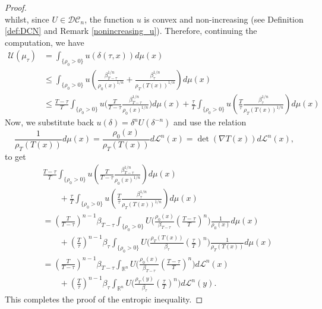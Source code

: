 \documentclass[10pt,a4paper]{amsart}
\begin{document}
\begin{proof}
\begin{equation}
			\end{equation}
			whilst, since $U\in\mathcal{DC}_n$, the function $u$ is convex and non-increasing (see Definition \ref{def:DCN} and Remark \ref{nonincreasing_u}). Therefore, continuing the computation, we have
			\begin{align}
				\mathcal{U}(\mu_\tau)&=\int_{\{\rho_0>0\}}u\left(\delta(\tau,x)\right)d\mu(x)\\
				&\leq\int_{\{\rho_0>0\}}u\left(\frac{\beta_{T-\tau}^{1/n}}{\rho_0(x)^{1/n}} +\frac{\beta_{\tau}^{1/n}}{\rho_T(T(x))^{1/n}}\right)d\mu(x)\\
				&\leq \frac{T-\tau}{T}\int_{\{\rho_0>0\}}u\bigg(\frac{T}{T-\tau}\frac{\beta_{T-\tau}^{1/n}}{\rho_0(x)^{1/n}}\bigg)d\mu(x)
				+\frac{\tau}{T}\int_{\{\rho_0>0\}}u\left(\frac{T}{\tau}\frac{\beta_{\tau}^{1/n}}{\rho_T(T(x))^{1/n}}\right)d\mu(x)
			\end{align}
			Now, we substitute back $u(\delta)=\delta^{n}U(\delta^{-n})$ and use the relation 
			\begin{equation}
				\frac{1}{\rho_T(T(x))}d\mu(x)=\frac{\rho_0(x)}{\rho_T(T(x))}d\mathscr{L}^n(x)=\det(\nabla T(x))d\mathscr{L}^n(x),
			\end{equation}
			to get
			\begin{align}
				&\frac{T-\tau}{T}\int_{\{\rho_0>0\}}u\left(\frac{T}{T-\tau}\frac{\beta_{T-\tau}^{1/n}}{\rho_0(x)^{1/n}}\right)d\mu(x)\\
				&\qquad+\frac{\tau}{T}\int_{\{\rho_0>0\}}u\left(\frac{T}{\tau}\frac{\beta_{\tau}^{1/n}}{\rho_T(T(x))^{1/n}}\right)d\mu(x)\\
				&=\left(\frac{T}{T-\tau}\right)^{n-1}\beta_{T-\tau}\int_{\{\rho_0>0\}}U\bigg(\frac{\rho_0(x)}{\beta_{T-\tau}}
				\left(\frac{T-\tau}{T}\right)^n\bigg)\frac{1}{\rho_0(x)}d\mu(x)\\
				&\qquad+\left(\frac{T}{\tau}\right)^{n-1}\beta_{\tau}\int_{\{\rho_0>0\}}U\bigg(\frac{\rho_T(T(x))}{\beta_{\tau}}
				\left(\frac{\tau}{T}\right)^n\bigg)\frac{1}{\rho_T(T(x))}d\mu(x)\\
				&=\left(\frac{T}{T-\tau}\right)^{n-1}\beta_{T-\tau}\int_{\mathbb{R}^n}U\bigg(\frac{\rho_0(x)}{\beta_{T-\tau}}
				\left(\frac{T-\tau}{T}\right)^n\bigg)d\mathscr{L}^n(x)\\
				&\qquad+\left(\frac{T}{\tau}\right)^{n-1}\beta_{\tau}\int_{\mathbb{R}^n}U\bigg(\frac{\rho_T(y)}{\beta_{\tau}}
				\left(\frac{\tau}{T}\right)^n\bigg)d\mathscr{L}^n(y).
			\end{align}
			This completes the proof of the entropic inequality.
		\end{proof}
\end{document}
